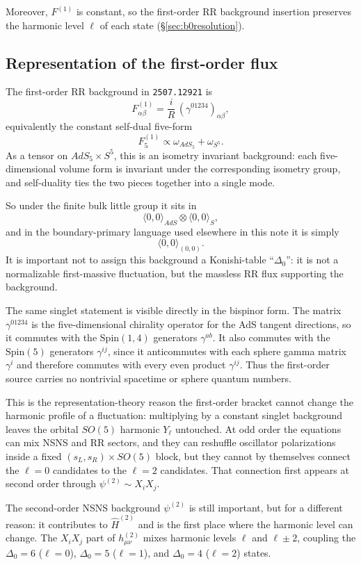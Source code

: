 \documentclass[12pt]{article}
\def\be{\begin{equation}}
\def\ee{\end{equation}}
\newcommand{\D}{\ensuremath{\Delta}}
\begin{document}
Moreover, $F^{(1)}$ is constant, so the first-order RR background insertion preserves the harmonic
level $\ell$ of each state (\S\ref{sec:b0resolution}).

\subsection{Representation of the first-order flux}

The first-order RR background in \texttt{2507.12921} is
\be
F^{(1)}_{\alpha\beta}=\frac{i}{R}\,(\gamma^{01234})_{\alpha\beta},
\ee
equivalently the constant self-dual five-form
\be
F_5^{(1)}\propto \omega_{AdS_5}+\omega_{S^5}.
\ee
As a tensor on $AdS_5\times S^5$, this is an isometry invariant background:
each five-dimensional volume form is invariant under the corresponding isometry group,
and self-duality ties the two pieces together into a single mode.

So under the finite bulk little group it sits in
\be
\langle 0,0\rangle_{AdS}\otimes \langle 0,0\rangle_{S},
\ee
and in the boundary-primary language used elsewhere in this note it is simply
\be
\langle 0,0\rangle_{(0,0)}.
\ee
It is important not to assign this background a Konishi-table ``$\D_0$'': it is not a
normalizable first-massive fluctuation, but the massless RR flux supporting the background.

The same singlet statement is visible directly in the bispinor form.
The matrix $\gamma^{01234}$ is the five-dimensional chirality operator for the AdS tangent
directions, so it commutes with the $\mathrm{Spin}(1,4)$ generators $\gamma^{ab}$.
It also commutes with the $\mathrm{Spin}(5)$ generators $\gamma^{ij}$, since it anticommutes with
each sphere gamma matrix $\gamma^i$ and therefore commutes with every even product
$\gamma^{ij}$.
Thus the first-order source carries no nontrivial spacetime or sphere quantum numbers.

This is the representation-theory reason the first-order bracket cannot change the harmonic
profile of a fluctuation: multiplying by a constant singlet background leaves the orbital
$SO(5)$ harmonic $Y_\ell$ untouched. At odd order the equations can mix NSNS and RR sectors,
and they can reshuffle oscillator polarizations inside a fixed $(s_L,s_R)\times SO(5)$ block,
but they cannot by themselves connect the $\ell=0$ candidates to the $\ell=2$ candidates.
That connection first appears at second order through $\psi^{(2)}\sim X_iX_j$.

The second-order NSNS background $\psi^{(2)}$ is still important, but for a different reason:
it contributes to $\widehat H^{(2)}$ and is the first place where the harmonic level can change.
The $X_iX_j$ part of $h^{(2)}_{\mu\nu}$ mixes harmonic levels $\ell$ and $\ell\pm 2$,
coupling the $\D_0=6$ ($\ell=0$), $\D_0=5$ ($\ell=1$), and $\D_0=4$ ($\ell=2$) states.
\end{document}
